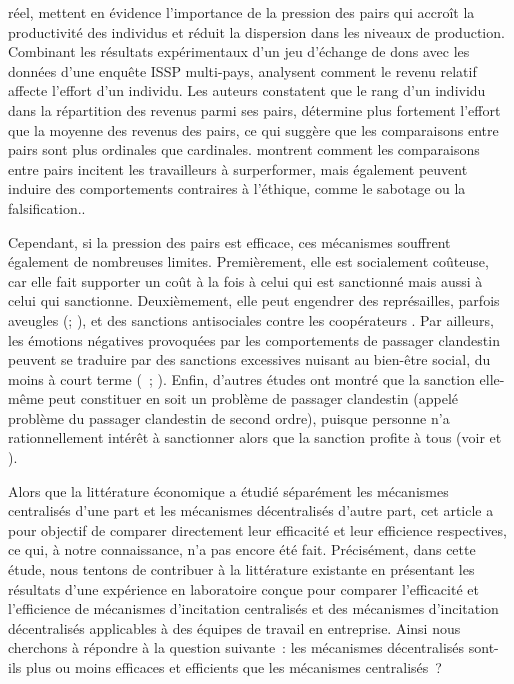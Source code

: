 \begin{Article}
\begin{refsection}[Lebourges]
{  réel, \textcite{FalkIchino2006} mettent en évidence l'importance de la
  pression des pairs qui accroît la productivité des individus et réduit
  la dispersion dans les niveaux de production. Combinant les résultats
  expérimentaux d'un jeu d'échange de dons avec les données d'une
  enquête ISSP multi-pays, \textcite{ClarkMascletVilleval2010}
  analysent comment le revenu relatif affecte l'effort d'un individu.
  Les auteurs constatent que le rang d'un individu dans la répartition
  des revenus parmi ses pairs, détermine plus fortement l'effort que la
  moyenne des revenus des pairs, ce qui suggère que les comparaisons
  entre pairs sont plus ordinales que cardinales. \textcite{CharnessMascletVilleval2014} montrent comment les comparaisons entre pairs
  incitent les travailleurs à surperformer, mais également peuvent
  induire des comportements contraires à l'éthique, comme le sabotage ou
  la falsification.}.

Cependant, si la pression des pairs est efficace, ces mécanismes
souffrent également de nombreuses limites. Premièrement, elle est
socialement coûteuse, car elle fait supporter un coût à la fois à celui
qui est sanctionné mais aussi à celui qui sanctionne. Deuxièmement, elle
peut engendrer des représailles, parfois aveugles (\textcite{Nikiforakis2004}; \textcite{DenantBoemontMascletNoussair2007}), et des
sanctions antisociales contre les coopérateurs \parencite{CinyabugumaPagePutterman2004, CinyabugumaPagePutterman2006}. Par ailleurs, les émotions négatives
provoquées par les comportements de passager clandestin peuvent se
traduire par des sanctions excessives nuisant au bien-être social, du
moins à court terme (\textcite{GächterRennerSefton2008}~; \textcite{DickinsonMasclet2015}). Enfin, d'autres études ont montré que la sanction
elle-même peut constituer en soit un problème de passager clandestin
(appelé problème du passager clandestin de second ordre), puisque
personne n'a rationnellement intérêt à sanctionner alors que la sanction
profite à tous (voir \textcite{Nikiforakis2004} et \textcite{DenantBoemontMascletNoussair2007}).

Alors que la littérature économique a étudié séparément les mécanismes
centralisés d'une part et les mécanismes décentralisés d'autre part, cet
article a pour objectif de comparer directement leur efficacité et leur
efficience respectives, ce qui, à notre connaissance, n'a pas encore été
fait. Précisément, dans cette étude, nous tentons de contribuer à la
littérature existante en présentant les résultats d'une expérience en
laboratoire conçue pour comparer l'efficacité et l'efficience de
mécanismes d'incitation centralisés et des mécanismes d'incitation
décentralisés applicables à des équipes de travail en entreprise. Ainsi
nous cherchons à répondre à la question suivante~: les mécanismes
décentralisés sont-ils plus ou moins efficaces et efficients que les
mécanismes centralisés~?


\end{refsection}
\end{Article}
